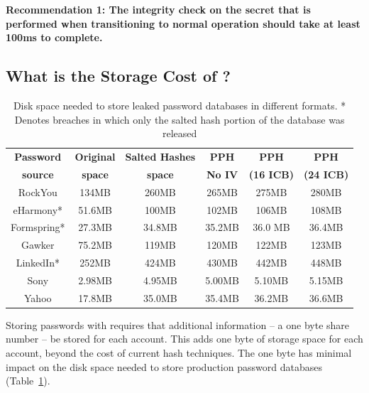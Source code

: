 {\bf Recommendation 1: The integrity check on the secret that is performed
when transitioning to normal operation should take at
least 100ms to complete.}

\subsection{What is the Storage Cost of \PPH?}

\begin{table}[t]
    \centering
    \renewcommand{\arraystretch}{1.3}

    \begin{tabular}{| c | c | c | c | c | c |}
    \hline
    {\bf Password } & {\bf Original} & {\bf Salted Hashes} & {\bf PPH }& {\bf PPH } & {\bf PPH }\\
    {\bf source} & {\bf space} & {\bf space} & {\bf No IV} & {\bf (16 ICB)} & {\bf (24 ICB)}\\
    \hline
    RockYou & 134MB & 260MB & 265MB & 275MB & 280MB\\
    \hline
    eHarmony* & 51.6MB & 100MB & 102MB & 106MB & 108MB\\
    \hline
    Formspring* & 27.3MB & 34.8MB & 35.2MB & 36.0 MB & 36.4MB\\
    \hline
    Gawker & 75.2MB & 119MB & 120MB & 122MB & 123MB \\
    \hline
    LinkedIn* & 252MB & 424MB & 430MB & 442MB & 448MB\\
    \hline
    Sony & 2.98MB & 4.95MB & 5.00MB & 5.10MB & 5.15MB\\
    \hline
    Yahoo & 17.8MB & 35.0MB & 35.4MB & 36.2MB & 36.6MB\\
    \hline
    \end{tabular}
    \caption{Disk space needed to store leaked password databases in
    different formats. * Denotes breaches in which only the salted hash portion
    of the database was released}
    \label{TABLE:disk-space}
\end{table}




Storing passwords with \PPH requires that additional information
-- a one byte share number -- be stored for each account.  This adds one byte
of storage space for each account, beyond the cost of current hash techniques.
The one byte has minimal impact on the disk space needed to store production
password databases (Table~\ref{TABLE:disk-space}).

